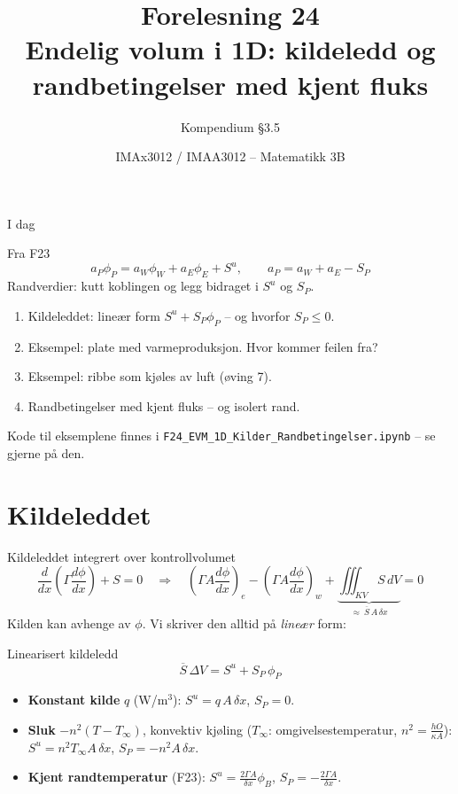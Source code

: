 \documentclass[11pt,aspectratio=169]{beamer}
\title[F24 -- Kilder og randbetingelser]{Forelesning 24\\ Endelig volum i 1D: kildeledd og randbetingelser med kjent fluks}
\subtitle{Kompendium §3.5}
\author{IMAx3012 / IMAA3012 -- Matematikk 3B}
\date{}
\begin{document}
\begin{frame}
\titlepage
\end{frame}

\begin{frame}{I dag}
\begin{remb}{Fra F23}
\[
a_P\phi_P = a_W\phi_W + a_E\phi_E + S^u, \qquad a_P = a_W + a_E - S_P
\]
Randverdier: kutt koblingen og legg bidraget i $S^u$ og $S_P$.
\end{remb}
\begin{enumerate}
\item Kildeleddet: lineær form $S^u + S_P\phi_P$ -- og hvorfor $S_P\le 0$.
\item Eksempel: plate med varmeproduksjon. Hvor kommer feilen fra?
\item Eksempel: ribbe som kjøles av luft (øving 7).
\item Randbetingelser med kjent fluks -- og isolert rand.
\end{enumerate}
\medskip
Kode til eksemplene finnes i \texttt{F24\_EVM\_1D\_Kilder\_Randbetingelser.ipynb} -- se gjerne på den.
\end{frame}

\section{Kildeleddet}

\begin{frame}{Kildeleddet integrert over kontrollvolumet}
\[
\frac{d}{dx}\left(\Gamma\frac{d\phi}{dx}\right) + S = 0
\quad\Longrightarrow\quad
\left(\Gamma A\frac{d\phi}{dx}\right)_e - \left(\Gamma A\frac{d\phi}{dx}\right)_w + \underbrace{\iiint_{KV} S\,dV}_{\approx\ \overline S\,A\,\delta x} = 0
\]
Kilden kan avhenge av $\phi$. Vi skriver den alltid på \emph{lineær} form:
\begin{oppsumb}{Linearisert kildeledd}
\[
\overline S\,\Delta V = S^u + S_P\,\phi_P
\]
\end{oppsumb}
\begin{itemize}
\item \textbf{Konstant kilde} $q$ (W/m$^3$): \quad $S^u = q\,A\,\delta x$, \quad $S_P = 0$.
\item \textbf{Sluk} $-n^2(T - T_\infty)$, konvektiv kjøling ($T_\infty$: omgivelsestemperatur, $n^2=\frac{hO}{\kappa A}$): \quad $S^u = n^2 T_\infty A\,\delta x$, \quad $S_P = -n^2 A\,\delta x$.
\item \textbf{Kjent randtemperatur} (F23): \quad $S^u = \frac{2\Gamma A}{\delta x}\phi_B$, \quad $S_P = -\frac{2\Gamma A}{\delta x}$.
\end{itemize}
\end{frame}
\end{document}
